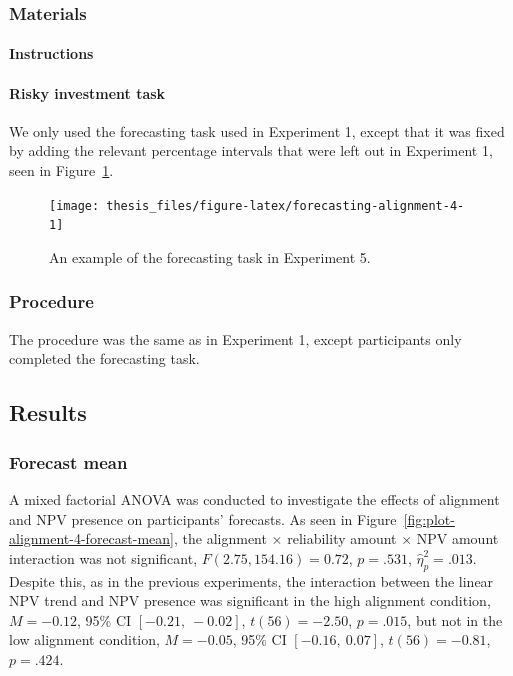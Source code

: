 \documentclass[a4paper, nobind, dvipsnames]{templates/ociamthesis}
\theoremstyle{definition}
\theoremstyle{definition}
\theoremstyle{definition}
\theoremstyle{definition}
\theoremstyle{remark}
\begin{document}
\hypertarget{materials-13}{%
\subsubsection{Materials}\label{materials-13}}

\hypertarget{instructions-8}{%
\paragraph{Instructions}\label{instructions-8}}

\hypertarget{risky-investment-task-1}{%
\paragraph{Risky investment task}\label{risky-investment-task-1}}

We only used the forecasting task used in Experiment 1, except that it was fixed
by adding the relevant percentage intervals that were left out in Experiment 1,
seen in Figure~\ref{fig:forecasting-alignment-4}.



\begin{figure}
\texttt{[image: thesis\_files/figure-latex/forecasting-alignment-4-1]} \caption{An example of the forecasting task in Experiment 5.}\label{fig:forecasting-alignment-4}
\end{figure}

\hypertarget{procedure-9}{%
\subsubsection{Procedure}\label{procedure-9}}

The procedure was the same as in Experiment 1, except participants only
completed the forecasting task.

\hypertarget{results-7}{%
\subsection{Results}\label{results-7}}

\hypertarget{forecast-mean-1}{%
\subsubsection{Forecast mean}\label{forecast-mean-1}}

A mixed factorial ANOVA was conducted to investigate the effects of alignment
and NPV presence on participants' forecasts. As seen in
Figure~\ref{fig:plot-alignment-4-forecast-mean}, the alignment \(\times\)
reliability amount \(\times\) NPV amount interaction was not significant,
\(F(2.75, 154.16) = 0.72\), \(p = .531\), \(\hat{\eta}^2_p = .013\).
Despite this, as in the previous experiments, the interaction between the linear
NPV trend and NPV presence was significant in the high alignment condition,
\(M = -0.12\), 95\% CI \([-0.21,~-0.02]\), \(t(56) = -2.50\), \(p = .015\), but not in the
low alignment condition,
\(M = -0.05\), 95\% CI \([-0.16,~0.07]\), \(t(56) = -0.81\), \(p = .424\).
\end{document}
